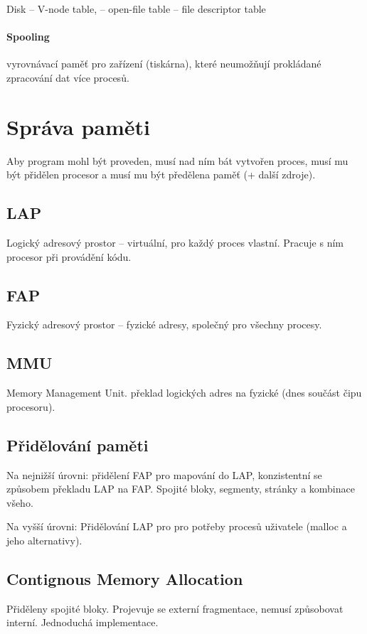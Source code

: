 \documentclass[a4paper, 11pt]{report}
\begin{document}
Disk -- V-node table, -- open-file table -- file descriptor table

\paragraph{Spooling} vyrovnávací paměť pro zařízení (tiskárna), které neumožňují prokládané zpracování dat více procesů.


\section{Správa paměti}

Aby program mohl být proveden, musí nad ním bát vytvořen proces, musí mu být přidělen procesor a musí mu být předělena paměť (+ další zdroje).

\subsection{LAP}
Logický adresový prostor -- virtuální, pro každý proces vlastní. Pracuje s ním procesor při provádění kódu.

\subsection{FAP}
Fyzický adresový prostor -- fyzické adresy, společný pro všechny procesy.

\subsection{MMU}
Memory Management Unit. překlad logických adres na fyzické (dnes součást čipu procesoru).

\subsection{Přidělování paměti}
Na nejnižší úrovni: přidělení FAP pro mapování do LAP, konzistentní se způsobem překladu LAP na FAP. Spojité bloky, segmenty, stránky a kombinace všeho.

Na vyšší úrovni: Přidělování LAP pro pro potřeby procesů uživatele (malloc a jeho alternativy).

\subsection{Contignous Memory Allocation}

Přiděleny spojité bloky. Projevuje se externí fragmentace, nemusí způsobovat interní. Jednoduchá implementace.
\end{document}
